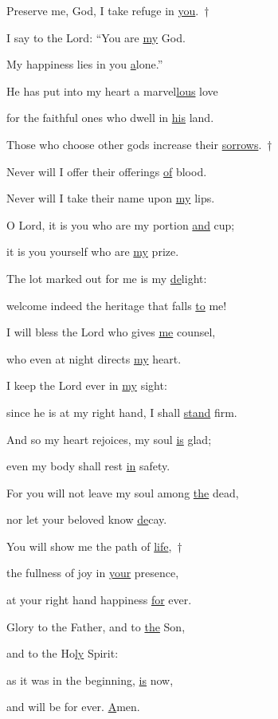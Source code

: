 \noindent Preserve me, God, I take refuge in \uline{you}.~†~\nopagebreak

I say to the Lord: “You are \uline{my} God. ~\GreStar{}~\nopagebreak

My happiness lies in you \uline{a}lone.”

\noindent He has put into my heart a marvel\uline{lous} love ~\GreStar{}~\nopagebreak

for the faithful ones who dwell in \uline{his} land.

\noindent Those who choose other gods increase their \uline{sorrows}.~†~\nopagebreak

Never will I offer their offerings \uline{of} blood. ~\GreStar{}~\nopagebreak

Never will I take their name upon \uline{my} lips.

\noindent O Lord, it is you who are my portion \uline{and} cup; ~\GreStar{}~\nopagebreak

it is you yourself who are \uline{my} prize.

\noindent The lot marked out for me is my \uline{de}light: ~\GreStar{}~\nopagebreak

welcome indeed the heritage that falls \uline{to} me!

\noindent I will bless the Lord who gives \uline{me} counsel, ~\GreStar{}~\nopagebreak

who even at night directs \uline{my} heart.

\noindent I keep the Lord ever in \uline{my} sight: ~\GreStar{}~\nopagebreak

since he is at my right hand, I shall \uline{stand} firm.

\noindent And so my heart rejoices, my soul \uline{is} glad; ~\GreStar{}~\nopagebreak

even my body shall rest \uline{in} safety.

\noindent For you will not leave my soul among \uline{the} dead, ~\GreStar{}~\nopagebreak

nor let your beloved know \uline{de}cay.

\noindent You will show me the path of \uline{life},~†~\nopagebreak

the fullness of joy in \uline{your} presence, ~\GreStar{}~\nopagebreak

at your right hand happiness \uline{for} ever.

\noindent Glory to the Father, and to \uline{the} Son,~\GreStar{}~\nopagebreak

and to the Ho\uline{ly} Spirit:

\noindent as it was in the beginning, \uline{is} now,~\GreStar{}~\nopagebreak

and will be for ever. \uline{A}men.
